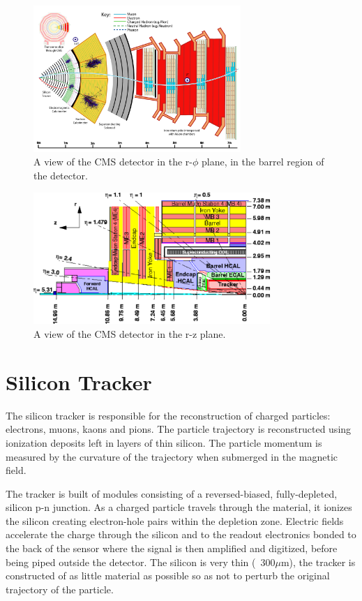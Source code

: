 \begin{figure}[hbp!]
\centering
\includegraphics[width=0.7\textwidth]{figs/CMS-PRF-14-001_Figure_001.pdf}
\caption{A view of the CMS detector in the r-$\phi$ plane, in the barrel region of the detector.}
\label{fig:schematicview}
\end{figure}

\begin{figure}[hbp!]
\centering
\includegraphics[width=0.8\textwidth]{figs/img41.pdf}
\caption{A view of the CMS detector in the r-z plane.}
\label{fig:detectoreta}
\end{figure}

\section{Silicon Tracker}

The silicon tracker is responsible for the reconstruction of charged particles: electrons, muons, kaons and pions. The particle trajectory is reconstructed using ionization deposits left in layers of thin silicon. The particle momentum is measured by the curvature of the trajectory when submerged in the magnetic field.\cite{trackertdr} \cite{trackertdradd}

The tracker is built of modules consisting of a reversed-biased, fully-depleted, silicon p-n junction. As a charged particle travels through the material, it ionizes the silicon creating electron-hole pairs within the depletion zone. Electric fields accelerate the charge through the silicon and to the readout electronics bonded to the back of the sensor where the signal is then amplified and digitized, before being piped outside the detector. The silicon is very thin (~300$\mu$m), the tracker is constructed of as little material as possible so as not to perturb the original trajectory of the particle.

